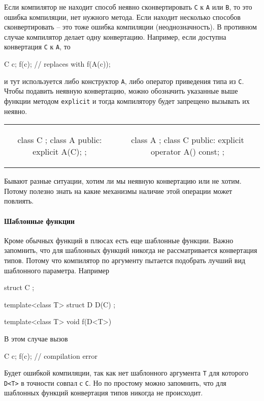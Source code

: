 Если компилятор не находит способ неявно сконвертировать \verb"C" к \verb"A" или \verb"B", то это ошибка компиляции, нет нужного метода.
Если находит несколько способов сконвертировать -- это тоже ошибка компиляции (неоднозначность).
В противном случае компилятор делает одну конвертацию.
Например, если доступна конвертация \verb"C" к \verb"A", то
\begin{cppcode}
C c;
f(c);
// replaces with
f(A(c));
\end{cppcode}
и тут используется либо конструктор \verb"A", либо оператор приведения типа из \verb"C".
Чтобы подавить неявную конвертацию, можно обозначить указанные выше функции методом \verb"explicit" и тогда компилятору будет запрещено вызывать их неявно.
\begin{center}
\begin{tabular}{cc}
{
\begin{minipage}[\baselineskip]{5.5cm}
\begin{cppcode}[numbers = none]
class C {};
class A {
public:
  explicit A(C);
};
\end{cppcode}
\end{minipage}
}&{
\begin{minipage}[\baselineskip]{5.5cm}
\begin{cppcode}[numbers = none]
class A {};
class C {
public:
  explicit operator A() const;
};
\end{cppcode}
\end{minipage}
}
\end{tabular}
\end{center}
Бывают разные ситуации, хотим ли мы неявную конвертацию или не хотим.
Потому полезно знать на какие механизмы наличие этой операции может повлиять.

\paragraph{Шаблонные функции}

Кроме обычных функций в плюсах есть еще шаблонные функции.
Важно запомнить, что для шаблонных функций никогда не рассматривается конвертация типов.
Потому что компилятор по аргументу пытается подобрать лучший вид шаблонного параметра.
Например
\begin{cppcode}
struct C {
};

template<class T>
struct D {
  D(C) {}
};

template<class T>
void f(D<T>) {}
\end{cppcode}
В этом случае вызов
\begin{cppcode}
C c;
f(c); // compilation error
\end{cppcode}
Будет ошибкой компиляции, так как нет шаблонного аргумента \verb"T" для которого \verb"D<T>" в точности совпал с \verb"C".
Но по простому можно запомнить, что для шаблонных функций конвертация типов никогда не происходит.

